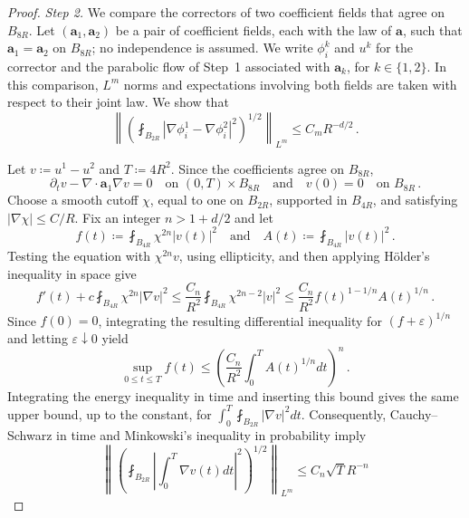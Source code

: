 \documentclass[11pt]{amsart}
\theoremstyle{definition}
\theoremstyle{remark}
\numberwithin{equation}{section}
\renewcommand{\a}{\mathbf a}
\begin{document}
\begin{proof}
\emph{Step 2.} We compare the correctors of two coefficient fields that agree on $B_{8R}$. Let $(\a_1,\a_2)$ be a pair of coefficient fields, each with the law of $\a$, such that $\a_1=\a_2$ on $B_{8R}$; no independence is assumed. We write $\phi_i^k$ and $u^k$ for the corrector and the parabolic flow of Step~1 associated with $\a_k$, for $k\in\{1,2\}$. In this comparison, $L^m$ norms and expectations involving both fields are taken with respect to their joint law. We show that
\begin{equation}\label{eq.paired-corrector-energy}
 \left\|\left(\fint_{B_{2R}}|\nabla\phi_i^1-\nabla\phi_i^2|^2\right)^{1/2}\right\|_{L^m}
 \leq C_mR^{-d/2}\, .
\end{equation}

Let $v\coloneqq u^1-u^2$ and $T\coloneqq4R^2$. Since the coefficients agree on $B_{8R}$,
\begin{equation*}
 \partial_tv-\nabla\cdot\a_1\nabla v=0
 \quad\text{on }(0,T)\times B_{8R}
 \quad\text{and}\quad v(0)=0\quad\text{on }B_{8R}\, .
\end{equation*}
Choose a smooth cutoff $\chi$, equal to one on $B_{2R}$, supported in $B_{4R}$, and satisfying $|\nabla\chi|\leq C/R$. Fix an integer $n>1+d/2$ and let
\begin{equation*}
 f(t)\coloneqq\fint_{B_{4R}}\chi^{2n}|v(t)|^2
 \quad\text{and}\quad A(t)\coloneqq\fint_{B_{4R}}|v(t)|^2\, .
\end{equation*}
Testing the equation with $\chi^{2n}v$, using ellipticity, and then applying H\"older's inequality in space give
\begin{equation*}
 f'(t)+c\fint_{B_{4R}}\chi^{2n}|\nabla v|^2
 \leq\frac{C_n}{R^2}\fint_{B_{4R}}\chi^{2n-2}|v|^2
 \leq\frac{C_n}{R^2}f(t)^{1-1/n}A(t)^{1/n}\, .
\end{equation*}
Since $f(0)=0$, integrating the resulting differential inequality for $(f+\varepsilon)^{1/n}$ and letting $\varepsilon\downarrow0$ yield
\begin{equation*}
 \sup_{0\leq t\leq T}f(t)
 \leq\left(\frac{C_n}{R^2}\int_0^TA(t)^{1/n}dt\right)^n\, .
\end{equation*}
Integrating the energy inequality in time and inserting this bound gives the same upper bound, up to the constant, for $\int_0^T\fint_{B_{2R}}|\nabla v|^2dt$. Consequently, Cauchy--Schwarz in time and Minkowski's inequality in probability imply
\begin{equation*}
 \left\|\left(\fint_{B_{2R}}
 \left|\int_0^T\nabla v(t)dt\right|^2\right)^{1/2}\right\|_{L^m}
 \leq C_n\sqrt T R^{-n}

\end{equation*}
\end{proof}
\end{document}
